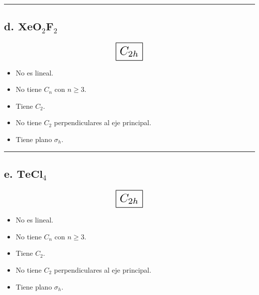 \iffalse
No es lineal.
Tiene un $C_5$ solamente por lo tanto no tiene mas de dos $C_n$ con $n \geq 3$.
Tiene un $C_5$.
Si tiene ejes $C_2$ perpendiculares al eje principal.
Si tiene un plano de reflexión $\sigma_h$.

D_5h
\fi

\begin{center}
    \rule{15cm}{0.4pt}
\end{center}


\subsection*{d. $\textbf{XeO}_2 \textbf{F}_2$}

\[ \scalebox{1.7}{$\boxed{C_{2h}}$} \]

\begin{itemize}
    \item No es lineal.
    \item No tiene $C_n$ con $n \geq 3$.
    \item Tiene $C_2$.
    \item No tiene $C_2$ perpendiculares al eje principal.
    \item Tiene plano $\sigma_h$.
\end{itemize}

\iffalse
No es lineal.
No tiene $C_n$ con $n \geq 3$.
Tiene $C_2$.
No tiene $C_2$ perpendiculares al eje principal.
Tiene plano $\sigma_h$.

C_2h
\fi

\begin{center}
    \rule{15cm}{0.4pt}
\end{center}


\subsection*{e. $\textbf{TeCl}_4$}

\[ \scalebox{1.7}{$\boxed{C_{2h}}$} \]

\begin{itemize}
    \item No es lineal.
    \item No tiene $C_n$ con $n \geq 3$.
    \item Tiene $C_2$.
    \item No tiene $C_2$ perpendiculares al eje principal.
    \item Tiene plano $\sigma_h$.
\end{itemize}

